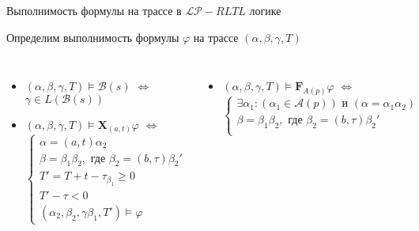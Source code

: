\documentclass{beamer}
\begin{document}
\begin{frame}{Выполнимость формулы на трассе в $\mathcal{LP}-RLTL$ логике}

Определим выполнимость формулы $\varphi$ на трассе 
$(\alpha, \beta, \gamma, T)$

\begin{columns}[t,onlytextwidth]

\begin{itemize}
 \item $(\alpha, \beta, \gamma, T) \models \mathcal{B}(s)$ $\Longleftrightarrow$ $\gamma \in L(\mathcal{B}(s))$
 
 \item $(\alpha, \beta, \gamma, T) \models \mathbf{X}_{(a, t)}\varphi$ 
    $\Longleftrightarrow$
    \begin{equation*}
        \begin{cases}
        
        \alpha = (a, t)\alpha_2 \\
       
        \beta = \beta_1\beta_2, \text{ где }
        \beta_2 = (b, \tau)\beta_2' \\
        
        T' = T + t - \tau_{\beta_1} \geq 0 \\
        
        T' - \tau < 0 \\
        
        (\alpha_2, \beta_2, \gamma\beta_1, T') \models \varphi
	
        \end{cases}
    \end{equation*}
\end{itemize}


\begin{itemize}
    \item $(\alpha, \beta, \gamma, T) \models \mathbf{F}_{A(p)}\varphi$ 
          $\Longleftrightarrow$
    \begin{equation*}
        \begin{cases}

        \exists \alpha_1: (\alpha_1 \in \mathcal{A}(p)) \text{ и } (\alpha = \alpha_1\alpha_2) \\

        \beta = \beta_1\beta_2, \text{ где } 
        \beta_2 = (b, \tau)\beta_2' \\
        

\end{cases}
\end{equation*}
\end{itemize}
\end{columns}
\end{frame}
\end{document}
